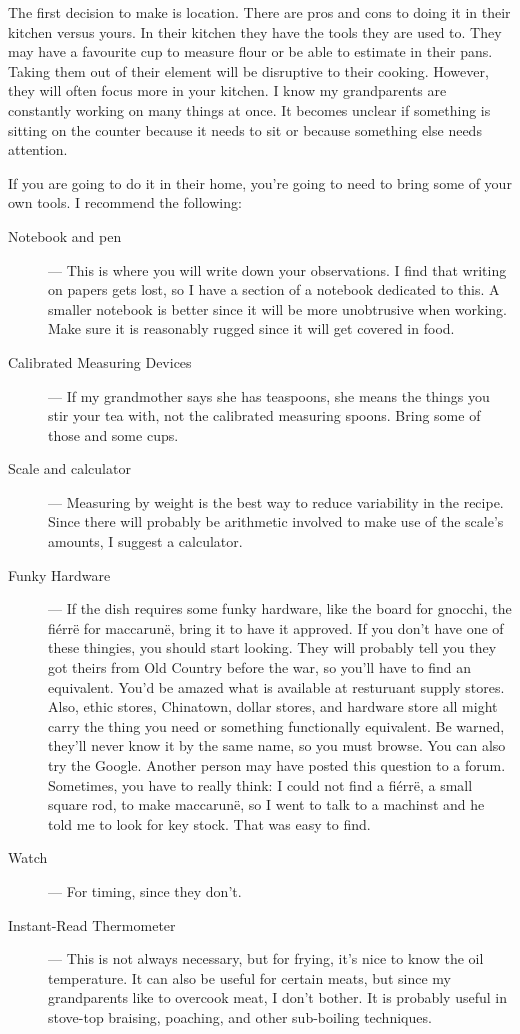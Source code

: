 The first decision to make is location. There are pros and cons to doing it in their kitchen versus yours. In their kitchen they have the tools they are used to. They may have a favourite cup to measure flour or be able to estimate in their pans. Taking them out of their element will be disruptive to their cooking. However, they will often focus more in your kitchen. I know my grandparents are constantly working on many things at once. It becomes unclear if something is sitting on the counter because it needs to sit or because something else needs attention.

If you are going to do it in their home, you're going to need to bring some of your own tools. I recommend the following:

\begin{description}
\item[Notebook and pen] --- This is where you will write down your observations. I find that writing on papers gets lost, so I have a section of a notebook dedicated to this. A smaller notebook is better since it will be more unobtrusive when working. Make sure it is reasonably rugged since it will get covered in food.
\item[Calibrated Measuring Devices] --- If my grandmother says she has teaspoons, she means the things you stir your tea with, not the calibrated measuring spoons. Bring some of those and some cups.
\item[Scale and calculator] --- Measuring by weight is the best way to reduce variability in the recipe. Since there will probably be arithmetic involved to make use of the scale's amounts, I suggest a calculator.
\item[Funky Hardware] --- If the dish requires some funky hardware, like the board for gnocchi, the fi\'err\"e for maccarun\"e, bring it to have it approved. If you don't have one of these thingies, you should start looking. They will probably tell you they got theirs from Old Country before the war, so you'll have to find an equivalent. You'd be amazed what is available at resturuant supply stores. Also, ethic stores, Chinatown, dollar stores, and hardware store all might carry the thing you need or something functionally equivalent. Be warned, they'll never know it by the same name, so you must browse. You can also try the Google. Another person may have posted this question to a forum. Sometimes, you have to really think: I could not find a fiérrë, a small square rod, to make maccarunë, so I went to talk to a machinst and he told me to look for key stock. That was easy to find.
\item[Watch] --- For timing, since they don't.
\item[Instant-Read Thermometer] --- This is not always necessary, but for frying, it's nice to know the oil temperature. It can also be useful for certain meats, but since my grandparents like to overcook meat, I don't bother. It is probably useful in stove-top braising, poaching, and other sub-boiling techniques.
\end{description}


